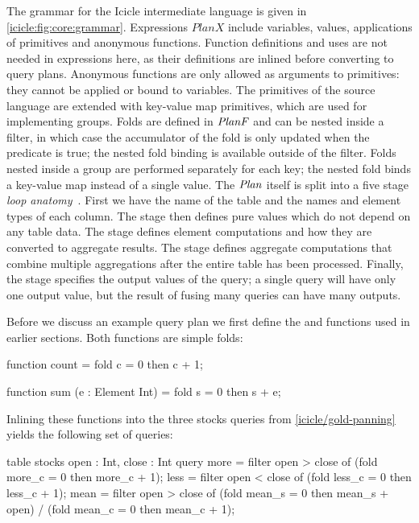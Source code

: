 The grammar for the Icicle intermediate language is given in \cref{icicle:fig:core:grammar}.
Expressions $PlanX$ include variables, values, applications of primitives and anonymous functions.
Function definitions and uses are not needed in expressions here, as their definitions are inlined before converting to query plans.
Anonymous functions are only allowed as arguments to primitives: they cannot be applied or bound to variables.
The primitives of the source language are extended with key-value map primitives, which are used for implementing groups.
Folds are defined in $\mathit{PlanF}$ and can be nested inside a filter, in which case the accumulator of the fold is only updated when the predicate is true; the nested fold binding is available outside of the filter.
Folds nested inside a group are performed separately for each key; the nested fold binds a key-value map instead of a single value.
The $\mathit{Plan}$ itself is split into a five stage \emph{loop anatomy}~\cite{shivers2005anatomy}.
First we have the name of the table and the names and element types of each column.
The \IcC@before@ stage then defines pure values which do not depend on any table data.
The \IcC@folds@ stage defines element computations and how they are converted to aggregate results.
The \IcC@after@ stage defines aggregate computations that combine multiple aggregations after the entire table has been processed.
Finally, the \IcC@return@ stage specifies the output values of the query; a single query will have only one output value, but the result of fusing many queries can have many outputs.


Before we discuss an example query plan we first define the \IcC@count@ and \IcC@sum@ functions used in earlier sections.
Both functions are simple folds:
\begin{icicle}
function count
 = fold c = 0 then c + 1;

function sum (e : Element Int)
 = fold s = 0 then s + e;
\end{icicle}

Inlining these functions into the three stocks queries from \cref{icicle/gold-panning} yields the following set of queries:

\begin{icicle}
table stocks { open : Int, close : Int }
query 
  more = filter open > close of (fold more_c = 0 then more_c + 1);
  less = filter open < close of (fold less_c = 0 then less_c + 1);
  mean = filter open > close of
      (fold mean_s = 0 then mean_s + open) / (fold mean_c = 0 then mean_c + 1);
\end{icicle}

